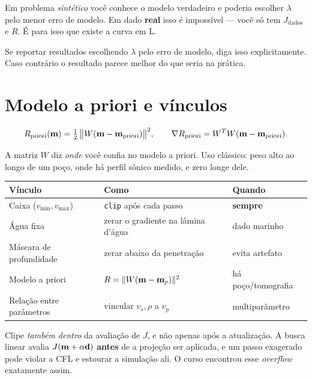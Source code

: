 \documentclass[11pt,a4paper,oneside]{report}
\begin{document}
\begin{armadilha}
Em problema \emph{sint\'etico} voc\^e conhece o modelo verdadeiro e poderia
escolher $\lambda$ pelo menor erro de modelo. Em dado \textbf{real} isso \'e
imposs\'ivel --- voc\^e s\'o tem $J_{\text{dados}}$ e $R$. \'E para isso que
existe a curva em L.

Se reportar resultados escolhendo $\lambda$ pelo erro de modelo, diga isso
explicitamente. Caso contr\'ario o resultado parece melhor do que seria na
pr\'atica.
\end{armadilha}

\section{Modelo a priori e v\'inculos}

\begin{equation}
R_{\text{priori}}(\mathbf{m}) = \tfrac{1}{2}\,
\bigl\|W(\mathbf{m}-\mathbf{m}_{\text{priori}})\bigr\|^{2},
\qquad
\nabla R_{\text{priori}} = W^{T}W(\mathbf{m} - \mathbf{m}_{\text{priori}}).
\end{equation}

A matriz $W$ diz \emph{onde} voc\^e confia no modelo a priori. Uso
cl\'assico: peso alto ao longo de um po\c{c}o, onde h\'a perfil s\^onico
medido, e zero longe dele.

\begin{center}
\begin{tabular}{@{}lll@{}}
\toprule
\textbf{V\'inculo} & \textbf{Como} & \textbf{Quando} \\
\midrule
Caixa ($v_{\min}, v_{\max}$) & \texttt{clip} ap\'os cada passo & \textbf{sempre} \\
\'Agua fixa & zerar o gradiente na l\^amina d'\'agua & dado marinho \\
M\'ascara de profundidade & zerar abaixo da penetra\c{c}\~ao & evita artefato \\
Modelo a priori & $R = \lVert W(\mathbf{m}-\mathbf{m}_p) \rVert^{2}$ & h\'a po\c{c}o/tomografia \\
Rela\c{c}\~ao entre par\^ametros & vincular $v_s,\rho$ a $v_p$ & multipar\^ametro \\
\bottomrule
\end{tabular}
\end{center}

\begin{atencao}
Clipe \emph{tamb\'em dentro} da avalia\c{c}\~ao de $J$, e n\~ao apenas ap\'os
a atualiza\c{c}\~ao. A busca linear avalia $J(\mathbf{m}+\alpha\mathbf{d})$
\textbf{antes} de a proje\c{c}\~ao ser aplicada, e um passo exagerado pode
violar a CFL e estourar a simula\c{c}\~ao ali. O curso encontrou esse
\emph{overflow} exatamente assim.
\end{atencao}
\end{document}
